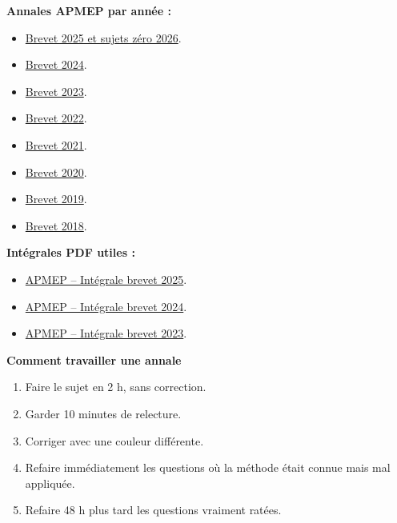 \documentclass[11pt,a4paper]{article}
\newcounter{correction}
\begin{document}
\begin{retenir}
\textbf{Annales APMEP par année :}
\begin{itemize}
  \item \href{https://www.apmep.fr/Brevet-2025}{Brevet 2025 et sujets zéro 2026}.
  \item \href{https://www.apmep.fr/Brevet-2024}{Brevet 2024}.
  \item \href{https://www.apmep.fr/Brevet-2023}{Brevet 2023}.
  \item \href{https://www.apmep.fr/Brevet-2022}{Brevet 2022}.
  \item \href{https://www.apmep.fr/Brevet-2021}{Brevet 2021}.
  \item \href{https://www.apmep.fr/Brevet-2020}{Brevet 2020}.
  \item \href{https://www.apmep.fr/Brevet-2019}{Brevet 2019}.
  \item \href{https://www.apmep.fr/Brevet-2018}{Brevet 2018}.
\end{itemize}
\end{retenir}

\begin{retenir}
\textbf{Intégrales PDF utiles :}
\begin{itemize}
  \item \href{https://www.apmep.fr/IMG/pdf/Annee_2025_Brevet.pdf}{APMEP -- Intégrale brevet 2025}.
  \item \href{https://www.apmep.fr/IMG/pdf/Brevet_annee_2024_DV.pdf}{APMEP -- Intégrale brevet 2024}.
  \item \href{https://www.apmep.fr/IMG/pdf/Brevet_Annee_2023_DV_2.pdf}{APMEP -- Intégrale brevet 2023}.
\end{itemize}
\end{retenir}

\begin{methode}
\textbf{Comment travailler une annale}
\begin{enumerate}
  \item Faire le sujet en 2 h, sans correction.
  \item Garder 10 minutes de relecture.
  \item Corriger avec une couleur différente.
  \item Refaire immédiatement les questions où la méthode était connue mais mal appliquée.
  \item Refaire 48 h plus tard les questions vraiment ratées.
\end{enumerate}
\end{methode}
\end{document}
